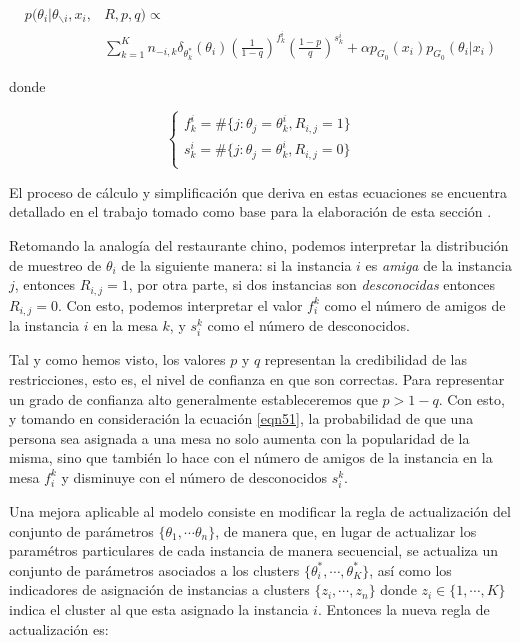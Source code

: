 \begin{equation}
\begin{split}
p(\theta_i | \theta_{\backslash i}, x_i,& R, p, q) \varpropto \\
 &\sum_{k = 1}^{K} n_{-i,k} \delta_{\theta_{k}^*}(\theta_{i}) \left(\frac{1}{1-q}\right)^{f_{k}^i} \left(\frac{1-p}{q}\right)^{s_{k}^i} + \alpha p_{G_0}(x_i)p_{G_0}(\theta_i | x_i)
\end{split}
\label{eqn51}
\end{equation}

donde 

\begin{equation}
\begin{cases}
f_{k}^i = \#\{j:\theta_j = \theta_{k}^i, R_{i,j} = 1\}\\
s_{k}^i = \#\{j:\theta_j = \theta_{k}^i, R_{i,j} = 0\}\\
\end{cases}
\label{eqn52}
\end{equation}

El proceso de cálculo y simplificación que deriva en estas ecuaciones se encuentra detallado en el trabajo tomado como base para la elaboración de esta sección \cite{RDPM:2015}.

Retomando la analogía del restaurante chino, podemos interpretar la distribución de muestreo de $\theta_i$ de la siguiente manera: si la instancia $i$ es \textit{amiga} de la instancia $j$, entonces $R_{i,j} = 1$, por otra parte, si dos instancias son \textit{desconocidas} entonces $R_{i,j} = 0$. Con esto, podemos interpretar el valor $f_{i}^k$ como el número de amigos de la instancia $i$ en la mesa $k$, y $s_{i}^k$ como el número de desconocidos.

Tal y como hemos visto, los valores $p$ y $q$ representan la credibilidad de las restricciones, esto es, el nivel de confianza en que son correctas. Para representar un grado de confianza alto generalmente estableceremos que $p > 1 - q$. Con esto, y tomando en consideración la ecuación \ref{eqn51}, la probabilidad de que una persona sea asignada a una mesa no solo aumenta con la popularidad de la misma, sino que también lo hace con el número de amigos de la instancia en la mesa $f_{i}^k$ y disminuye con el número de desconocidos $s_{i}^k$.

Una mejora aplicable al modelo consiste en modificar la regla de actualización del conjunto de parámetros $ \{\theta_1, \cdots \theta_n\}$, de manera que, en lugar de actualizar los paramétros particulares de cada instancia de manera secuencial, se actualiza un conjunto de parámetros asociados a los clusters $\{\theta_i^*, \cdots, \theta_K^*\}$, así como los indicadores de asignación de instancias a clusters $\{z_i, \cdots, z_n\}$ donde $z_i\in \{1, \cdots, K\}$ indica el cluster al que esta asignado la instancia $i$. Entonces la nueva regla de actualización es:

